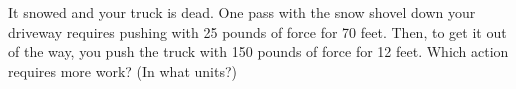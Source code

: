 It snowed and your truck is dead.  One pass with the snow shovel down your driveway requires pushing with 25 pounds of force for 70 feet.  Then, to get it out of the way, you push the truck with 150 pounds of force for 12 feet.  Which action requires more work?  (In what units?)